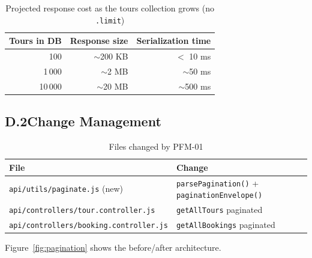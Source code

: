 \documentclass[11pt,a4paper]{article}
\begin{document}
\begin{table}[H]
\centering\small
\begin{tabular}{@{}rrr@{}}
\toprule
\textbf{Tours in DB} & \textbf{Response size} & \textbf{Serialization time} \\
\midrule
100     & $\sim$200 KB & $<$ 10 ms \\
1\,000  & $\sim$2 MB   & $\sim$50 ms \\
10\,000 & $\sim$20 MB  & $\sim$500 ms \\
\bottomrule
\end{tabular}
\caption{Projected response cost as the tours collection grows (no \texttt{.limit})}
\end{table}

\subsection{D.2\quad Change Management}

\begin{table}[H]
\centering\small
\begin{tabularx}{\textwidth}{@{}lX@{}}
\toprule
\textbf{File} & \textbf{Change} \\
\midrule
\texttt{api/utils/paginate.js} (new) & \texttt{parsePagination()} + \texttt{paginationEnvelope()} \\
\texttt{api/controllers/tour.controller.js} & \texttt{getAllTours} paginated \\
\texttt{api/controllers/booking.controller.js} & \texttt{getAllBookings} paginated \\
\bottomrule
\end{tabularx}
\caption{Files changed by PFM-01}
\end{table}

Figure~\ref{fig:pagination} shows the before/after architecture.
\end{document}
